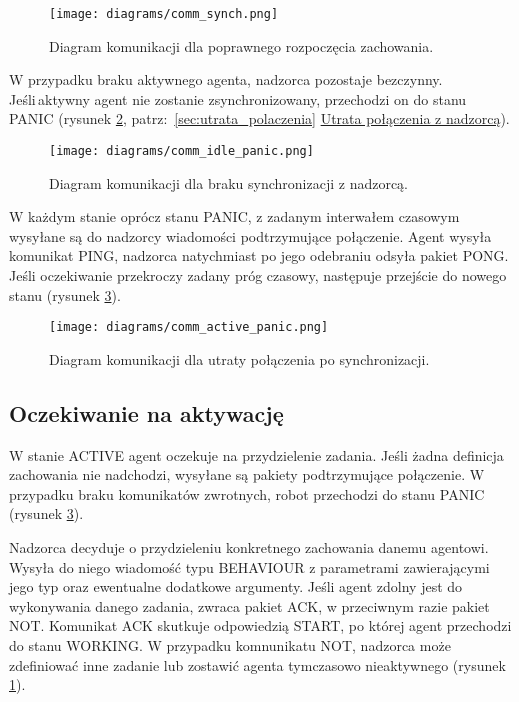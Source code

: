 \begin{figure}[!ht]
    \centering
        \texttt{[image: diagrams/comm\_synch.png]}
    \caption{Diagram komunikacji dla poprawnego rozpoczęcia zachowania.\label{fig:comm_synch}}
\end{figure}

W przypadku braku aktywnego agenta, nadzorca pozostaje bezczynny. \\Jeśli\,aktywny agent nie zostanie zsynchronizowany, przechodzi on do stanu PANIC (rysunek \ref{fig:comm_idle_panic}, patrz:~\ref{sec:utrata_polaczenia} \hyperref[sec:utrata_polaczenia]{Utrata połączenia z nadzorcą}).

\begin{figure}[!ht]
    \centering
        \texttt{[image: diagrams/comm\_idle\_panic.png]}
    \caption{Diagram komunikacji dla braku synchronizacji z nadzorcą.\label{fig:comm_idle_panic}}
\end{figure}

W każdym stanie oprócz stanu PANIC, z zadanym interwałem czasowym wysyłane są do nadzorcy wiadomości podtrzymujące połączenie. Agent wysyła komunikat PING, nadzorca natychmiast po jego odebraniu odsyła pakiet PONG. Jeśli oczekiwanie przekroczy zadany próg czasowy, następuje przejście do nowego stanu (rysunek {\ref{fig:comm_active_panic}}).

\begin{figure}[!ht]
    \centering
        \texttt{[image: diagrams/comm\_active\_panic.png]}
    \caption{Diagram komunikacji dla utraty połączenia po synchronizacji.\label{fig:comm_active_panic}}
\end{figure}

\subsection{Oczekiwanie na aktywację}

W stanie ACTIVE agent oczekuje na przydzielenie zadania. Jeśli żadna definicja zachowania nie nadchodzi, wysyłane są pakiety podtrzymujące połączenie. W przypadku braku komunikatów zwrotnych, robot przechodzi do stanu PANIC (rysunek \ref{fig:comm_active_panic}).

Nadzorca decyduje o przydzieleniu konkretnego zachowania danemu agentowi. Wysyła do niego wiadomość typu BEHAVIOUR z parametrami zawierającymi jego typ oraz ewentualne dodatkowe argumenty. Jeśli agent zdolny jest do wykonywania danego zadania, zwraca pakiet ACK, w przeciwnym razie pakiet NOT. Komunikat ACK skutkuje odpowiedzią START, po której agent przechodzi do stanu WORKING. W przypadku komnunikatu NOT, nadzorca może zdefiniować inne zadanie lub zostawić agenta tymczasowo nieaktywnego (rysunek \ref{fig:comm_synch}).

